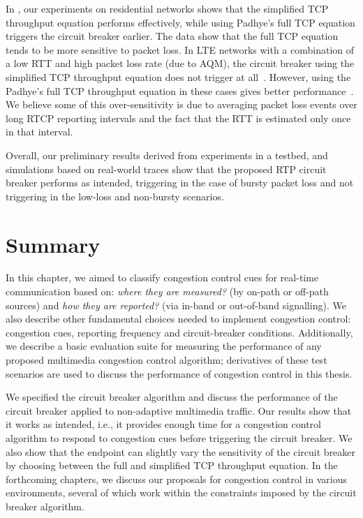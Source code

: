 In , our experiments on residential networks shows that the
simplified TCP throughput equation performs effectively, while using Padhye's
full TCP equation triggers the circuit breaker earlier. The data show that
the full TCP equation tends to be more sensitive to packet loss. In LTE
networks with a combination of a low RTT and high packet loss rate (due to
AQM), the circuit breaker using the simplified TCP throughput equation
does not trigger at all~\cite{Sarker:CB.lte}. However, using the Padhye's full TCP
throughput equation in these cases gives better
performance~\cite{Sarker:CB.lte}. We believe some of this over-sensitivity is
due to averaging packet loss events over long RTCP reporting intervals and the
fact that the RTT is estimated only once in that interval.

Overall, our preliminary results derived from experiments in a testbed,
and simulations based on real-world traces show that
the proposed RTP circuit breaker performs as intended, triggering in the case
of bursty packet loss and not triggering in the low-loss and non-bursty
scenarios.



\section{Summary}

In this chapter, we aimed to classify congestion control cues for real-time
communication based on: \emph{where they are measured?} (by on-path or off-path
sources) and \emph{how they are reported?} (via in-band or out-of-band
signalling). We also describe other fundamental choices needed to implement
congestion control: congestion cues, reporting frequency and circuit-breaker
conditions. Additionally, we describe a basic evaluation suite for measuring
the performance of any proposed multimedia congestion control algorithm;
derivatives of these test scenarios are used to discuss the performance of
congestion control in this thesis.

We specified the circuit breaker algorithm and discuss the performance of the
circuit breaker applied to non-adaptive multimedia traffic. Our results show
that it works as intended, i.e., it provides enough time for a congestion
control algorithm to respond to congestion cues before triggering the circuit
breaker. We also show that the endpoint can slightly vary the sensitivity of
the circuit breaker by choosing between the full and simplified TCP throughput
equation. In the forthcoming chapters, we discuss our proposals for congestion
control in various environments, several of which work within the constraints
imposed by the circuit breaker algorithm.


